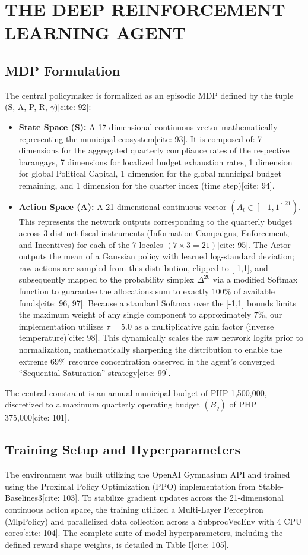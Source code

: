\documentclass[conference]{IEEEtran}
\begin{document}
\section{THE DEEP REINFORCEMENT LEARNING AGENT}

\subsection{MDP Formulation}
The central policymaker is formalized as an episodic MDP defined by the tuple (S, A, P, R, $\gamma$)[cite: 92]:
\begin{itemize}
    \item \textbf{State Space (S):} A 17-dimensional continuous vector mathematically representing the municipal ecosystem[cite: 93]. It is composed of: 7 dimensions for the aggregated quarterly compliance rates of the respective barangays, 7 dimensions for localized budget exhaustion rates, 1 dimension for global Political Capital, 1 dimension for the global municipal budget remaining, and 1 dimension for the quarter index (time step)[cite: 94].
    \item \textbf{Action Space (A):} A 21-dimensional continuous vector $(A_{t}\in[-1,1]^{21})$. This represents the network outputs corresponding to the quarterly budget across 3 distinct fiscal instruments (Information Campaigns, Enforcement, and Incentives) for each of the 7 locales $(7\times3=21)$[cite: 95]. The Actor outputs the mean of a Gaussian policy with learned log-standard deviation; raw actions are sampled from this distribution, clipped to [-1,1], and subsequently mapped to the probability simplex $\Delta^{20}$ via a modified Softmax function to guarantee the allocations sum to exactly 100\% of available funds[cite: 96, 97]. Because a standard Softmax over the [-1,1] bounds limits the maximum weight of any single component to approximately 7\%, our implementation utilizes $\tau=5.0$ as a multiplicative gain factor (inverse temperature)[cite: 98]. This dynamically scales the raw network logits prior to normalization, mathematically sharpening the distribution to enable the extreme 69\% resource concentration observed in the agent's converged ``Sequential Saturation'' strategy[cite: 99].
\end{itemize}

The central constraint is an annual municipal budget of PHP 1,500,000, discretized to a maximum quarterly operating budget $(B_{q})$ of PHP 375,000[cite: 101].

\subsection{Training Setup and Hyperparameters}
The environment was built utilizing the OpenAI Gymnasium API and trained using the Proximal Policy Optimization (PPO) implementation from Stable-Baselines3[cite: 103]. To stabilize gradient updates across the 21-dimensional continuous action space, the training utilized a Multi-Layer Perceptron (MlpPolicy) and parallelized data collection across a SubprocVecEnv with 4 CPU cores[cite: 104]. The complete suite of model hyperparameters, including the defined reward shape weights, is detailed in Table I[cite: 105].
\end{document}
